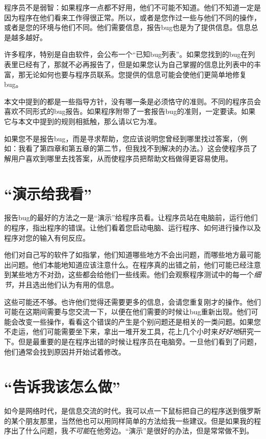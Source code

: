 \documentclass[titlepage]{article}
\begin{document}
程序员不是弱智：如果程序一点都不好用，他们不可能不知道。他们不知道一定是因为程序在他们看来工作得很正常。所以，或者是您作过一些与他们不同的操作，或者是您的环境与他们不同。他们需要信息，报告bug也是为了提供信息。信息总是越多越好。

许多程序，特别是自由软件，会公布一个“已知bug列表”。如果您找到的bug在列表里已经有了，那就不必再报告了，但是如果您认为自己掌握的信息比列表中的丰富，那无论如何也要与程序员联系。您提供的信息可能会使他们更简单地修复bug。

本文中提到的都是一些指导方针，没有哪一条是必须恪守的准则。不同的程序员会喜欢不同形式的bug报告。如果程序附带了一套报告bug的准则，一定要读。如果它与本文中提到的规则相抵触，那么请以它为准。

如果您不是报告bug，而是寻求帮助，您应该说明您曾经到哪里找过答案，（例如：我看了第四章和第五章的第二节，但我找不到解决的办法。）这会使程序员了解用户喜欢到哪里去找答案，从而使程序员把帮助文档做得更容易使用。

\section{{“演示给我看”}}

报告bug的最好的方法之一是“演示”给程序员看。让程序员站在电脑前，运行他们的程序，指出程序的错误。让他们看着您启动电脑、运行程序、如何进行操作以及程序对您的输入有何反应。

他们对自己写的软件了如指掌，他们知道哪些地方不会出问题，而哪些地方最可能出问题。他们本能地知道应该注意什么。在程序真的出错之前，他们可能已经注意到某些地方不对劲，这些都会给他们一些线索。他们会观察程序测试中的每一个\emph{细节}，并且选出他们认为有用的信息。

这些可能还不够。也许他们觉得还需要更多的信息，会请您重复刚才的操作。他们可能在这期间需要与您交流一下，以便在他们需要的时候让bug重新出现。他们可能会改变一些操作，看看这个错误的产生是个别问题还是相关的一类问题。如果您不走运，他们可能需要坐下来，拿出一堆开发工具，花上几个小时来\emph{好好地}研究一下。但是最重要的是在程序出错的时候让程序员在电脑旁。一旦他们看到了问题，他们通常会找到原因并开始试着修改。

\section{{“告诉我该怎么做”}}

如今是网络时代，是信息交流的时代。我可以点一下鼠标把自己的程序送到俄罗斯的某个朋友那里，当然他也可以用同样简单的方法给我一些建议。但是如果我的程序出了什么问题，我\emph{不可能}在他旁边。“演示”是很好的办法，但是常常做不到。
\end{document}
